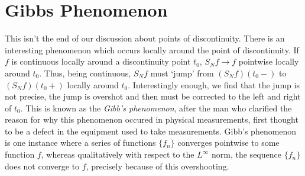 
\section{Gibbs Phenomenon}

This isn't the end of our discussion about points of discontinuity. There is an interesting phenomenon which occurs locally around the point of discontinuity. If $f$ is continuous locally around a discontinuity point $t_0$, $S_N f \to f$ pointwise locally around $t_0$. Thus, being continuous, $S_N f$ must `jump' from $(S_N f)(t_0-)$ to $(S_N f)(t_0+)$ locally around $t_0$. Interestingly enough, we find that the jump is not precise, the jump is overshot and then must be corrected to the left and right of $t_0$. This is known as the {\it Gibb's phenomenon}, after the man who clarified the reason for why this phenomenon occured in physical measurements, first thought to be a defect in the equipment used to take measurements. Gibb's phenomenon is one instance where a series of functions $\{ f_n \}$ converges pointwise to some function $f$, whereas qualitatively with respect to the $L^\infty$ norm, the sequence $\{ f_n \}$ does not converge to $f$, precisely because of this overshooting.

